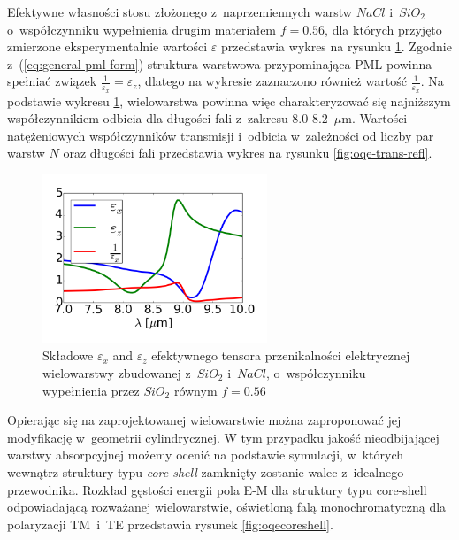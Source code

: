 Efektywne własności stosu złożonego z~naprzemiennych warstw $NaCl$ i~$SiO_2$ o~współczynniku wypełnienia drugim materiałem $f=0.56$, dla których przyjęto zmierzone eksperymentalnie wartości $\varepsilon$ przedstawia wykres na rysunku \ref{fig:eff-pml-real}. Zgodnie z~(\ref{eq:general-pml-form}) struktura warstwowa przypominająca PML powinna spełniać związek $\frac{1}{\varepsilon_x}=\varepsilon_z$, dlatego na wykresie zaznaczono również wartość $\frac{1}{\varepsilon_x}$. Na podstawie wykresu \ref{fig:eff-pml-real}, wielowarstwa powinna więc charakteryzować się najniższym współczynnikiem odbicia dla długości fali z~zakresu 8.0-8.2~$\mu$m. Wartości natężeniowych współczynników transmisji i~odbicia w~zależności od liczby par warstw $N$ oraz długości fali przedstawia wykres na rysunku \ref{fig:oqe-trans-refl}.

\begin{figure}
	\includegraphics[width=0.6\textwidth]{images/pml/effepsilon-nacl-sio2.png}
	\caption{Składowe $\varepsilon_x$ and $\varepsilon_z$ efektywnego tensora przenikalności elektrycznej wielowarstwy zbudowanej z~$SiO_2$ i~$NaCl$, o~współczynniku wypełnienia przez $SiO_2$ równym $f=0.56$}
	\label{fig:eff-pml-real}
\end{figure}

Opierając się na zaprojektowanej wielowarstwie można zaproponować jej modyfikację w~geometrii cylindrycznej. W tym przypadku jakość nieodbijającej warstwy absorpcyjnej możemy ocenić na podstawie symulacji, w~których wewnątrz struktury typu \textit{core-shell} zamknięty zostanie walec z~idealnego przewodnika. Rozkład gęstości energii pola E-M dla struktury typu core-shell odpowiadającą rozważanej wielowarstwie, oświetloną falą monochromatyczną dla polaryzacji TM~i~TE przedstawia rysunek \ref{fig:oqecoreshell}.

